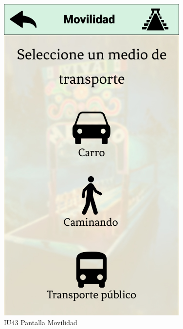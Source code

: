 \begin{figure}[h]
    \begin{minipage}{0.5\textwidth}
        \centering
        \includegraphics[width=.7\linewidth]{Pantallas Prototipo3/IU43-Movilidad.jpg}
        \caption{IU43 Pantalla Movilidad}
    \end{minipage}
    

\end{figure}
